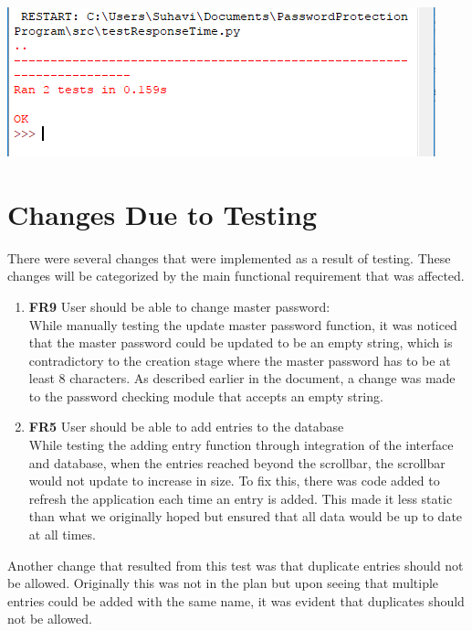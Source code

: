 \documentclass[12pt, titlepage]{article}
\begin{document}
		\includegraphics[scale=1]{testResponseTime.png}

\section{Changes Due to Testing}
	
	There were several changes that were implemented as a result of testing. These changes will be categorized by the main functional requirement that was affected.
	
	\begin{enumerate}

		\item \textbf{FR9} User should be able to change master password:\\
		While manually testing the update master password function, it was noticed that the master password could be updated to be an empty string, which is contradictory to the creation stage where the master password has to be at least 8 characters. As described earlier in the document, a change was made to the password checking module that accepts an empty string.
	
		\item \textbf{FR5} User should be able to add entries to the database\\
		While testing the adding entry function through integration of the interface and database, when the entries reached beyond the scrollbar, the scrollbar would not update to increase in size. To fix this, there was code added to refresh the application each time an entry is added. This made it less static than what we originally hoped but ensured that all data would be up to date at all times.

	\end{enumerate}

	\noindent
	Another change that resulted from this test was that duplicate entries should not be allowed. Originally this was not in the plan but upon seeing that multiple entries could be added with the same name, it was evident that duplicates should not be allowed.
	
\end{document}
